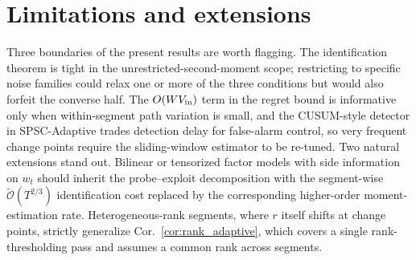 \documentclass{article}
\newcommand{\tilO}{\widetilde{\mathcal{O}}}
\begin{document}

\endgroup

\section{Limitations and extensions}
\label{app:limitations}

Three boundaries of the present results are worth flagging. The
identification theorem is tight in the unrestricted-second-moment
scope; restricting to specific noise families could relax one or
more of the three conditions but would also forfeit the converse
half. The $O(W V_{\rm in})$ term in the regret bound is informative
only when within-segment path variation is small, and the CUSUM-style
detector in SPSC-Adaptive trades detection delay for false-alarm
control, so very frequent change points require the sliding-window
estimator to be re-tuned. Two natural extensions stand out.
Bilinear or tensorized factor models with side information on $w_t$
should inherit the probe--exploit decomposition with the
segment-wise $\tilO(T^{2/3})$ identification cost replaced by the
corresponding higher-order moment-estimation rate.
Heterogeneous-rank segments, where $r$ itself shifts at change
points, strictly generalize Cor.~\ref{cor:rank_adaptive}, which
covers a single rank-thresholding pass and assumes a common rank
across segments.
\end{document}
